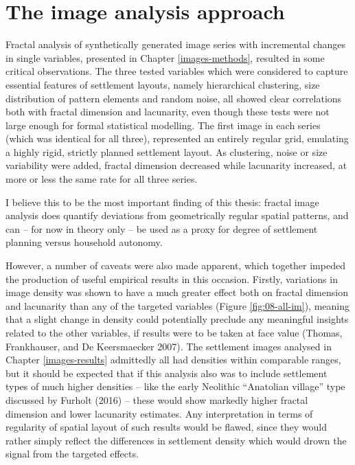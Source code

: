 \documentclass[
  12pt,
  a4paper, twoside]{book}
\begin{document}
\hypertarget{the-image-analysis-approach}{%
\section{The image analysis approach}\label{the-image-analysis-approach}}

Fractal analysis of synthetically generated image series with incremental changes in single variables, presented in Chapter \ref{images-methods}, resulted in some critical observations. The three tested variables which were considered to capture essential features of settlement layouts, namely hierarchical clustering, size distribution of pattern elements and random noise, all showed clear correlations both with fractal dimension and lacunarity, even though these tests were not large enough for formal statistical modelling. The first image in each series (which was identical for all three), represented an entirely regular grid, emulating a highly rigid, strictly planned settlement layout. As clustering, noise or size variability were added, fractal dimension decreased while lacunarity increased, at more or less the same rate for all three series.

I believe this to be the most important finding of this thesis: fractal image analysis does quantify deviations from geometrically regular spatial patterns, and can -- for now in theory only -- be used as a proxy for degree of settlement planning versus household autonomy.

However, a number of caveats were also made apparent, which together impeded the production of useful empirical results in this occasion. Firstly, variations in image density was shown to have a much greater effect both on fractal dimension and lacunarity than any of the targeted variables (Figure \ref{fig:08-all-im}), meaning that a slight change in density could potentially preclude any meaningful insights related to the other variables, if results were to be taken at face value (Thomas, Frankhauser, and De Keersmaecker 2007). The settlement images analysed in Chapter \ref{images-results} admittedly all had densities within comparable ranges, but it should be expected that if this analysis also was to include settlement types of much higher densities -- like the early Neolithic ``Anatolian village'' type discussed by Furholt (2016) -- these would show markedly higher fractal dimension and lower lacunarity estimates. Any interpretation in terms of regularity of spatial layout of such results would be flawed, since they would rather simply reflect the differences in settlement density which would drown the signal from the targeted effects.
\end{document}
